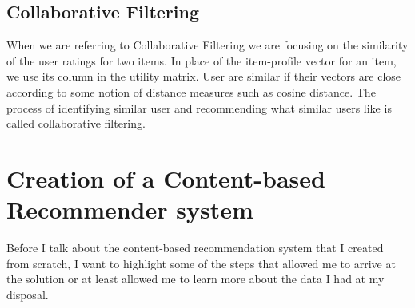 \documentclass[12pt,english]{report}
\begin{document}
\section{Collaborative Filtering}
When we are referring to Collaborative Filtering we are focusing on the similarity of the user ratings for two items. In place of the item-profile vector for an item, we use its column in the utility matrix. User are similar if their vectors are close according to some notion of distance measures such as cosine distance. The process of identifying similar user and recommending what similar users like is called collaborative filtering.
\chapter{Creation of a Content-based Recommender system}\label{ch:recsyscontbased}
Before I talk about the content-based recommendation system that I created from scratch, I want to highlight some of the steps that allowed me to arrive at the solution or at least allowed me to learn more about the data I had at my disposal.
\end{document}
